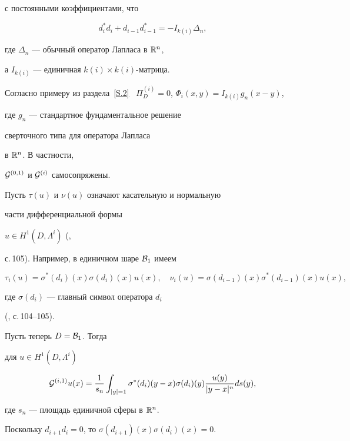 с постоянными коэффициентами, что


$$


d^*_i d_i+d_{i-1}d^*_{i-1}=-I_{k(i)} \Delta_n ,


$$


где $\Delta_n$ --- обычный оператор Лапласа в ${\Bbb R}^n$,


а $I_{k(i)}$ --- единичная $k(i) \times k(i)$-матрица.


Согласно примеру из раздела~\ref{S.2} \ $\Pi^{(i)}_D=0$, $\Phi_i(x,y)


= I_{k(i)} g_n (x-y)$,


где $g_n$ --- стандартное фундаментальное решение


сверточного типа для оператора Лапласа


в ${\Bbb R}^n$. В частности,


${\cal G}^{(0,1)}$ и ${\cal G}^{(i)}$ самосопряжены.





Пусть $\tau (u) $ и $\nu (u)$ означают касательную и нормальную


части дифференциальной формы


$u \in H^1 (D,\Lambda ^i)$ (\cite{Ta2},


с.\,105). Например, в единичном шаре ${\cal B}_1$ имеем


$$


\tau _i (u) =\sigma^* (d_i) (x) \sigma (d_i) (x) u(x), \quad


\nu _i (u)=\sigma (d_{i-1}) (x) \sigma ^* (d_{i-1}) (x)u (x) ,


$$


где $\sigma (d_i)$ --- главный символ оператора $d_i$


(\cite{Ta2}, с.\,104--105).





Пусть теперь $D ={\cal B}_1$. Тогда


для $u \in H^1 (D, \Lambda ^i)$


$$


{\cal G}^{(i,1)} u (x)=\frac{1}{s_n} \int_{|y| =1}


\sigma^* (d_i) (y-x)\sigma (d_i) (y) \frac{ u(y)}{|y-x|^n} ds (y),


$$


где $s_n$ --- площадь единичной сферы в ${\Bbb R}^n$.





Поскольку $d_{i+1}d_i=0$, то $\sigma (d_{i+1}) (x)\sigma (d_i) (x)=0$.


